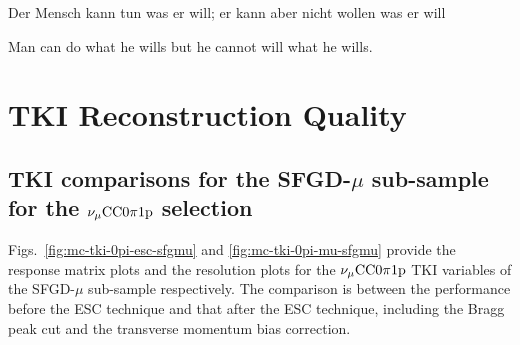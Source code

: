 \begin{savequote}[8cm]
Der Mensch kann tun was er will; er kann aber nicht wollen was er will

Man can do what he wills but he cannot will what he wills.
\end{savequote}

\chapter{\label{app:perf}TKI Reconstruction Quality}

\minitoc

\section*{TKI comparisons for the SFGD-$\mu$ sub-sample for the $\nu_{\mu}\textrm{CC}0\pi1\textrm{p}$ selection}
\label{sec:app-tki-sfgd-mu}
Figs.~\ref{fig:mc-tki-0pi-esc-sfgmu} and \ref{fig:mc-tki-0pi-mu-sfgmu} provide the response matrix plots and the resolution plots for the $\nu_{\mu}\textrm{CC}0\pi1\textrm{p}$ TKI variables of the SFGD-$\mu$ sub-sample respectively.
The comparison is between the performance before the ESC technique and that after the ESC technique, including the Bragg peak cut and the transverse momentum bias correction.
